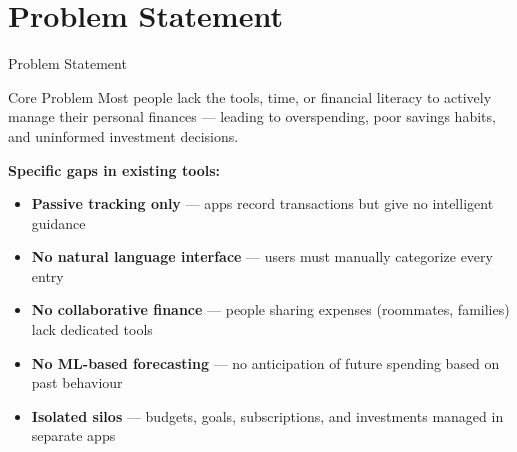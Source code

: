 \documentclass[aspectratio=169, 11pt]{beamer}
\newcommand{\bulletitem}[1]{\item[\textcolor{auraviolet}{\faCheckCircle}] #1}
\begin{document}
\section{Problem Statement}
\begin{frame}{Problem Statement}
  \begin{alertblock}{Core Problem}
    Most people lack the tools, time, or financial literacy to actively manage
    their personal finances — leading to overspending, poor savings habits, and
    uninformed investment decisions.
  \end{alertblock}

  \vspace{10pt}
  \textbf{Specific gaps in existing tools:}
  \vspace{4pt}
  \begin{itemize}
    \bulletitem{\textbf{Passive tracking only} — apps record transactions but give no intelligent guidance}
    \bulletitem{\textbf{No natural language interface} — users must manually categorize every entry}
    \bulletitem{\textbf{No collaborative finance} — people sharing expenses (roommates, families) lack dedicated tools}
    \bulletitem{\textbf{No ML-based forecasting} — no anticipation of future spending based on past behaviour}
    \bulletitem{\textbf{Isolated silos} — budgets, goals, subscriptions, and investments managed in separate apps}
  \end{itemize}
\end{frame}

\end{document}

